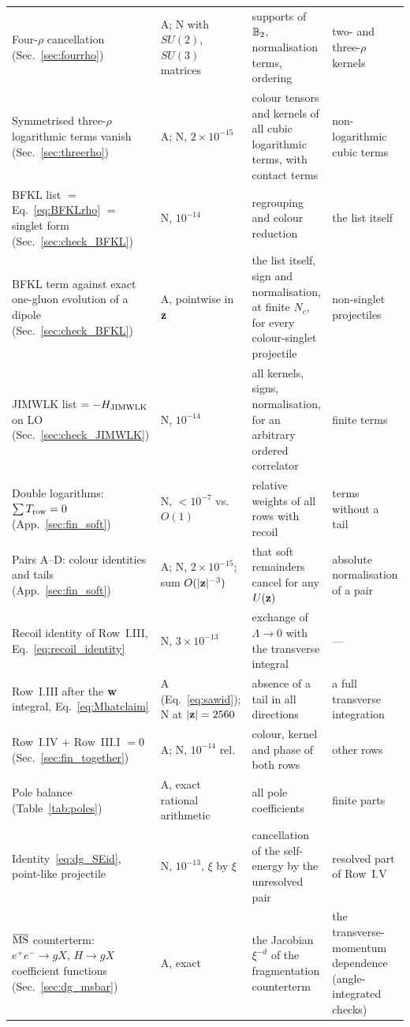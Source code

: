 \begin{longtable}{@{}>{\raggedright\arraybackslash}p{}>{\raggedright\arraybackslash}p{}>{\raggedright\arraybackslash}p{}>{\raggedright\arraybackslash}p{}@{}}
Four-$\rho$ cancellation (Sec.~\ref{sec:fourrho}) & A; N with $SU(2)$, $SU(3)$ matrices & supports of $\mathbb{B}_2$, normalisation terms, ordering & two- and three-$\rho$ kernels\\
Symmetrised three-$\rho$ logarithmic terms vanish (Sec.~\ref{sec:threerho}) & A; N, $2\times10^{-15}$ & colour tensors and kernels of all cubic logarithmic terms, with contact terms & non-logarithmic cubic terms\\
BFKL list $=$ Eq.~\eqref{eq:BFKLrho} $=$ singlet form (Sec.~\ref{sec:check_BFKL}) & N, $10^{-14}$ & regrouping and colour reduction & the list itself\\
BFKL term against exact one-gluon evolution of a dipole (Sec.~\ref{sec:check_BFKL}) & A, pointwise in $\mathbf{z}$ & the list itself, sign and normalisation, at finite $N_c$, for every colour-singlet projectile & non-singlet projectiles\\
JIMWLK list $=-H_{\rm JIMWLK}$ on LO (Sec.~\ref{sec:check_JIMWLK}) & N, $10^{-14}$ & all kernels, signs, normalisation, for an arbitrary ordered correlator & finite terms\\
Double logarithms: $\sum T_{\rm row}=0$ (App.~\ref{sec:fin_soft}) & N, $<10^{-7}$ vs.\ $O(1)$ & relative weights of all rows with recoil & terms without a tail\\
Pairs A--D: colour identities and tails (App.~\ref{sec:fin_soft}) & A; N, $2\times10^{-15}$; sum $O(|\mathbf{z}|^{-3})$ & that soft remainders cancel for any $U(\mathbf{z})$ & absolute normalisation of a pair\\
Recoil identity of Row~I.III, Eq.~\eqref{eq:recoil_identity} & N, $3\times10^{-13}$ & exchange of $\Lambda\to0$ with the transverse integral & ---\\
Row~I.III after the $\mathbf{w}$ integral, Eq.~\eqref{eq:Mhatclaim} & A (Eq.~\eqref{eq:sawid}); N at $|\mathbf{z}|=2560$ & absence of a tail in all directions & a full transverse integration\\
Row~I.IV $+$ Row~III.I $=0$ (Sec.~\ref{sec:fin_together}) & A; N, $10^{-14}$ rel. & colour, kernel and phase of both rows & other rows\\
Pole balance (Table~\ref{tab:poles}) & A, exact rational arithmetic & all pole coefficients & finite parts\\
Identity~\eqref{eq:dg_SEid}, point-like projectile & N, $10^{-13}$, $\xi$ by $\xi$ & cancellation of the self-energy by the unresolved pair & resolved part of Row~I.V\\
$\overline{\rm MS}$ counterterm: $e^+e^-\to gX$, $H\to gX$ coefficient functions (Sec.~\ref{sec:dg_msbar}) & A, exact & the Jacobian $\xi^{-d}$ of the fragmentation counterterm & the transverse-momentum dependence (angle-integrated checks)\\

\end{longtable}
